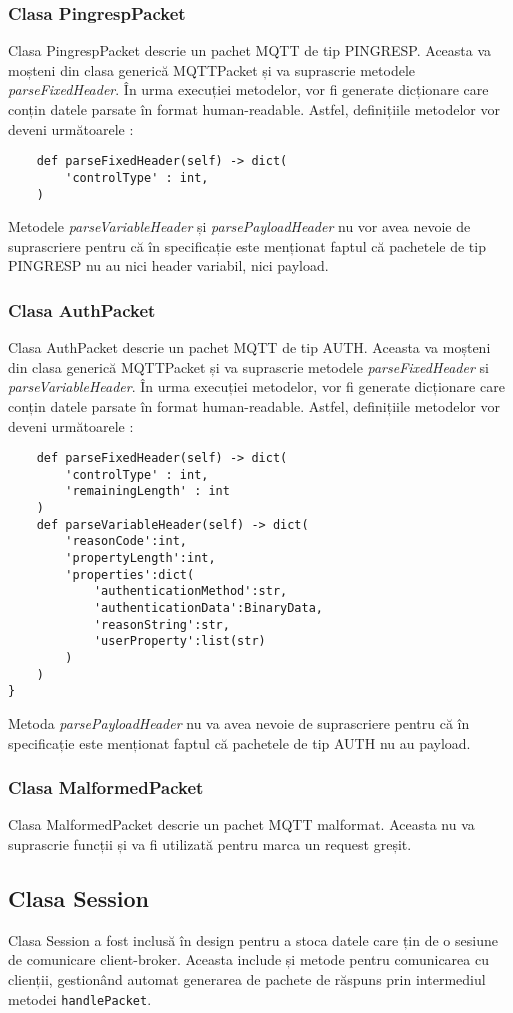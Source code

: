 \documentclass{report}
\begin{document}
\subsubsection{Clasa PingrespPacket}
Clasa PingrespPacket descrie un pachet MQTT de tip PINGRESP. Aceasta va moșteni din clasa generică MQTTPacket și va suprascrie metodele \emph{parseFixedHeader}.
În urma execuției metodelor, vor fi generate dicționare care conțin datele parsate în format human-readable.
Astfel, definițiile metodelor vor deveni următoarele : 
\\
\begin{verbatim}
	def parseFixedHeader(self) -> dict(
		'controlType' : int, 
	)
\end{verbatim}
Metodele \emph{parseVariableHeader} și \emph{parsePayloadHeader} nu vor avea nevoie de suprascriere pentru că în specificație este menționat faptul că pachetele de tip PINGRESP nu au nici header variabil, nici payload.
\subsubsection{Clasa AuthPacket}
Clasa AuthPacket descrie un pachet MQTT de tip AUTH. Aceasta va moșteni din clasa generică MQTTPacket și va suprascrie metodele \emph{parseFixedHeader} si \emph{parseVariableHeader}.
În urma execuției metodelor, vor fi generate dicționare care conțin datele parsate în format human-readable.
Astfel, definițiile metodelor vor deveni următoarele : 
\\
\begin{verbatim}
	def parseFixedHeader(self) -> dict(
		'controlType' : int, 
		'remainingLength' : int
	) 
    def parseVariableHeader(self) -> dict(
    	'reasonCode':int,
    	'propertyLength':int,
    	'properties':dict(
    		'authenticationMethod':str,
    		'authenticationData':BinaryData,
    		'reasonString':str,
    		'userProperty':list(str)
    	)
    )
}
\end{verbatim}
Metoda \emph{parsePayloadHeader} nu va avea nevoie de suprascriere pentru că în specificație este menționat faptul că pachetele de tip AUTH nu au payload.
\subsubsection{Clasa MalformedPacket}
Clasa MalformedPacket descrie un pachet MQTT malformat. Aceasta nu va suprascrie funcții și va fi utilizată pentru marca un request greșit.
\subsection{Clasa Session}
Clasa Session a fost inclusă în design pentru a stoca datele care țin de o sesiune de comunicare client-broker. Aceasta include și metode pentru comunicarea cu clienții, gestionând automat generarea de pachete de răspuns prin intermediul metodei \verb"handlePacket".
\end{document}
